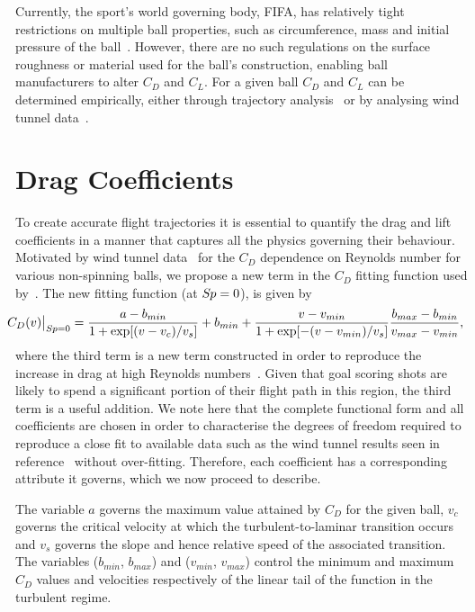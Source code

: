 \documentclass[a4paper]{article}
\begin{document}
Currently, the sport's world governing body, FIFA, has relatively tight restrictions on multiple ball properties, such as circumference, mass and initial pressure of the ball~\cite{FIFA-rules}.  However, there are no such regulations on the surface roughness or material used for the ball's construction, enabling ball manufacturers to alter $C_{D}$ and $C_{L}$.  For a given ball $C_D$ and $C_L$ can be determined empirically, either through trajectory analysis~\cite{CarreMJAsaiTAkatsukaTandHaakeSJ, JEGoff, GoffJEandCarreMJ, BrayKandKerwinDG} or by analysing wind tunnel data~\cite{CarreMJGoodwillSRandHaakeSJ, AsaiTSeoKKobayashiOandSakashitaR}.   

%
\section{Drag Coefficients}
\label{sect:DragCoefficients}
To create accurate flight trajectories it is essential to quantify the drag and lift coefficients in a manner that captures all the physics governing their behaviour.
Motivated by wind tunnel data~\cite{HaakeSJGoodwillSRandCarreMJ} for the $C_D$ dependence on Reynolds number for various non-spinning balls, we propose a new term in the $C_D$ fitting function used by~\cite{JEGoff, GiordanoNJandNakanishiH}.  The new fitting function (at $S\!{\kern 0.125em}p = 0$), is given by
%
\begin{equation}\label{eq:CD}
\!\!\!\!\!\!C_D(v)\big|_{S\!{\kern 0.125em}p = 0} = \frac{a - b_{min}}{1 + \exp[(v - v_c)/v_s]} + b_{min} + \frac{v - v_{min}}{1 + \exp[-(v - v_{min})/v_s]}\frac{b_{max} - b_{min}}{v_{max} - v_{min}},
\end{equation}
%
where the third term is a new term constructed in order to reproduce the increase in drag at high Reynolds numbers~\cite{HaakeSJGoodwillSRandCarreMJ}.  Given that goal scoring shots are likely to spend a significant portion of their flight path in this region, the third term is a useful addition.  We note here that the complete functional form and all coefficients are chosen in order to characterise the degrees of freedom required to reproduce a close fit to available data such as the wind tunnel results seen in reference~\cite{HaakeSJGoodwillSRandCarreMJ} without over-fitting.  Therefore, each coefficient has a corresponding attribute it governs, which we now proceed to describe.

The variable $a$ governs the maximum value attained by $C_D$ for the given ball, $v_c$ governs the critical velocity at which the turbulent-to-laminar transition occurs and $v_s$ governs the slope and hence relative speed of the associated transition. The variables ($b_{min}$, $b_{max}$) and ($v_{min}$, $v_{max}$) control the minimum and maximum $C_D$ values and velocities respectively of the linear tail of the function in the turbulent regime.  
\end{document}
